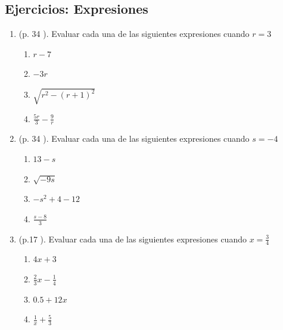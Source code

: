 \newpage

\begin{center}
	\vspace{-1cm}
	\subsection{ Ejercicios: Expresiones}\label{ejercicios:expresiones}
\end{center}

\begin{enumerate}
	\item (p. 34 \cite{Aops_algebra}). Evaluar cada una de las siguientes expresiones cuando $r=3$
	\begin{multicols}{2}
		\begin{enumerate}[label=\Alph*)]
			\item $r-7$
			\item $-3r$
			\item $\sqrt{r^2 - {(r+1)}^2}$
			\item $\frac{5r}{3} - \frac{9}{r}$
		\end{enumerate}
	\end{multicols}
	
	\item (p. 34 \cite{Aops_algebra}). Evaluar cada una de las siguientes expresiones cuando $s=-4$
	\begin{multicols}{2}
		\begin{enumerate}[label=\Alph*)]
			\item $13-s$
			\item $\sqrt{-9s}$
			\item $-s^2 +4 -12$
			\item $\frac{s-8}{3}$
		\end{enumerate}
	\end{multicols}
	
	\item (p.17 \cite{Dimensions_Math_6B}). Evaluar cada una de las siguientes expresiones cuando $x=\frac{3}{4}$
	\begin{multicols}{2}
		\begin{enumerate}[label=\Alph*)]
			\item $4x+3$
			\item $\frac{2}{3}x-\frac{1}{4}$
			\item $0.5 + 12x$
			\item $\frac{1}{x} + \frac{5}{3}$
		\end{enumerate}
	\end{multicols}
	
\end{enumerate}
\newpage

